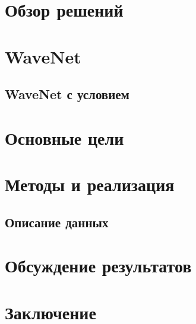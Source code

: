 \documentclass{spbau-diploma}
\begin{document}
\section{Обзор решений}
\label{sec:motivation}



\section{WaveNet}
\label{sec:wavenet}


\subsection{WaveNet с условием}
\label{sec:conditional_wavenet}


\section{Основные цели}
\label{sec:goals}



\section{Методы и реализация}

\subsection{Описание данных}
\label{sec:data}


\label{sec:implementation}


\newpage
\section{Обсуждение результатов}
\label{sec:experiments}



\section{Заключение}
\label{sec:results}




\end{document}
